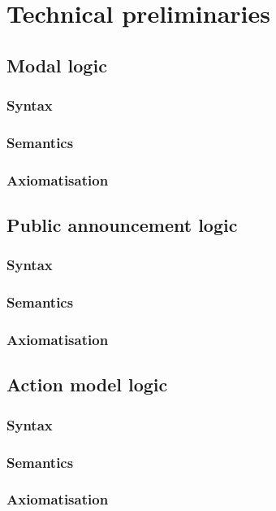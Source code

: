\chapter{Technical preliminaries}

\section{Modal logic}

\subsection{Syntax}

\subsection{Semantics}

\subsection{Axiomatisation}

\section{Public announcement logic}

\subsection{Syntax}

\subsection{Semantics}

\subsection{Axiomatisation}

\section{Action model logic}

\subsection{Syntax}

\subsection{Semantics}

\subsection{Axiomatisation}
